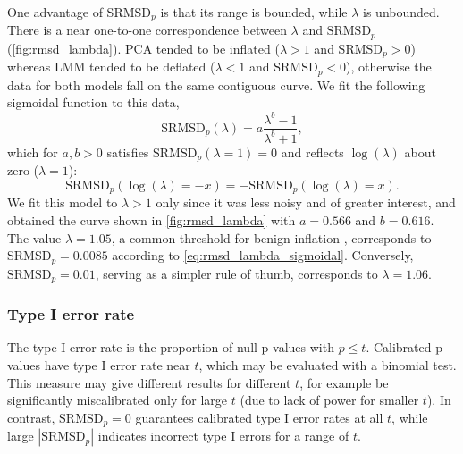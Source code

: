 \documentclass[11pt]{article}
\newcommand{\rmsd}{\text{SRMSD}_p}
\begin{document}
One advantage of $\rmsd$ is that its range is bounded, while $\lambda$ is unbounded.
There is a near one-to-one correspondence between $\lambda$ and $\rmsd$ (\cref{fig:rmsd_lambda}).
PCA tended to be inflated ($\lambda > 1$ and $\rmsd > 0$) whereas LMM tended to be deflated ($\lambda < 1$ and $\rmsd < 0$), otherwise the data for both models fall on the same contiguous curve.
We fit the following sigmoidal function to this data,
\begin{equation}
  \label{eq:rmsd_lambda_sigmoidal}
  \rmsd( \lambda ) = a \frac{ \lambda^b - 1 }{ \lambda^b + 1 },
\end{equation}
which for $a,b > 0$ satisfies $\rmsd( \lambda = 1 ) = 0$ and reflects $\log( \lambda )$ about zero ($\lambda = 1$):
$$
\rmsd( \log( \lambda ) = -x ) = - \rmsd( \log( \lambda ) = x ).
$$
We fit this model to $\lambda > 1$ only since it was less noisy and of greater interest, and obtained the curve shown in \cref{fig:rmsd_lambda} with $a = 0.566$ and $b = 0.616$.
The value $\lambda = 1.05$, a common threshold for benign inflation \citep{price_new_2010}, corresponds to $\rmsd = 0.0085$ according to \cref{eq:rmsd_lambda_sigmoidal}.
Conversely, $\rmsd = 0.01$, serving as a simpler rule of thumb, corresponds to $\lambda = 1.06$.

\subsubsection{Type I error rate}

The type I error rate is the proportion of null p-values with $p \le t$.
Calibrated p-values have type I error rate near $t$, which may be evaluated with a binomial test.
This measure may give different results for different $t$, for example be significantly miscalibrated only for large $t$ (due to lack of power for smaller $t$).
In contrast, $\rmsd = 0$ guarantees calibrated type I error rates at all $t$, while large $|\rmsd|$ indicates incorrect type I errors for a range of $t$.
\end{document}
